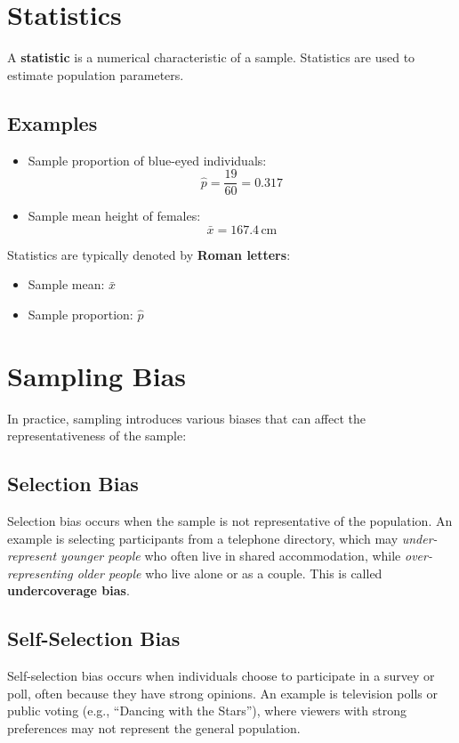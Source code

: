 \documentclass{article}
\begin{document}
\section{Statistics}
A \textbf{statistic} is a numerical characteristic of a sample. Statistics are used to estimate population parameters.

\subsection{Examples}
\begin{itemize}
    \item Sample proportion of blue-eyed individuals:
    \[
    \hat{p} = \frac{19}{60} = 0.317
    \]
    \item Sample mean height of females:
    \[
    \bar{x} = 167.4 \, \text{cm}
    \]
\end{itemize}
Statistics are typically denoted by \textbf{Roman letters}:
\begin{itemize}
    \item Sample mean: $\bar{x}$
    \item Sample proportion: $\hat{p}$
\end{itemize}

\section{Sampling Bias}
In practice, sampling introduces various biases that can affect the representativeness of the sample:

\subsection{Selection Bias}
Selection bias occurs when the sample is not representative of the population. An example is selecting participants from a telephone directory, which may \textit{under-represent younger people} who often live in shared accommodation, while \textit{over-representing older people} who live alone or as a couple. This is called \textbf{undercoverage bias}.

\subsection{Self-Selection Bias}
Self-selection bias occurs when individuals choose to participate in a survey or poll, often because they have strong opinions. An example is television polls or public voting (e.g., ``Dancing with the Stars''), where viewers with strong preferences may not represent the general population.
\end{document}
